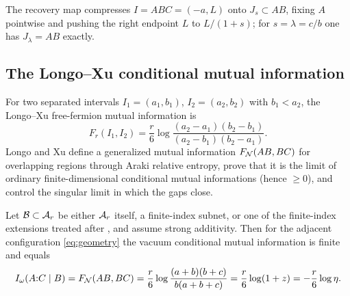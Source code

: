 \begin{center}
\end{center}
\noindent The recovery map compresses $I=ABC=(-a,L)$ onto $J_s\subset AB$, fixing
$A$ pointwise and pushing the right endpoint $L$ to $L/(1+s)$; for $s=\lambda=c/b$
one has $J_\lambda=AB$ exactly.

\subsection{The Longo--Xu conditional mutual information}
For two separated intervals $I_1=(a_1,b_1)$, $I_2=(a_2,b_2)$ with $b_1<a_2$, the
Longo--Xu free-fermion mutual information is
\begin{equation}\label{eq:LX-MI}
 F_r(I_1,I_2)=\frac r6\log\frac{(a_2-a_1)(b_2-b_1)}{(a_2-b_1)(b_2-a_1)} .
\end{equation}
Longo and Xu define a generalized mutual information $F_{\mathcal N}(AB,BC)$ for
overlapping regions through Araki relative entropy, prove that it is the limit of
ordinary finite-dimensional conditional mutual informations (hence
$\ge0$), and control the singular limit in which the gaps close.

\begin{theorem}\label{thm:LX}
Let $\mathcal B\subset\mathcal A_r$ be either $\mathcal A_r$ itself, a finite-index subnet, or one of
the finite-index extensions treated after \cite[Thm.~4.2]{LX}, and assume strong
additivity.  Then for the adjacent configuration \eqref{eq:geometry} the vacuum
conditional mutual information is finite and equals
\begin{equation}\label{eq:CMI}
 I_\omega(A{:}C\mid B)=F_{\mathcal N}(AB,BC)
 =\frac r6\log\frac{(a+b)(b+c)}{b(a+b+c)}
 =\frac r6\log(1+z)=-\frac r6\log\eta .
\end{equation}
\end{theorem}

